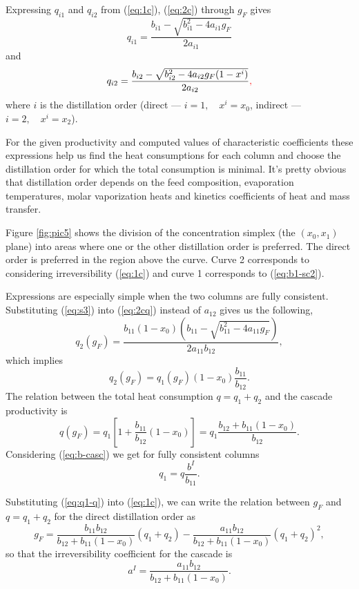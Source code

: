 \documentclass[12pt]{article}
\newcommand{\RED}[1]{\textcolor{red}{#1}}
\begin{document}
Expressing $q_{i1}$ and $q_{i2}$ from (\ref{eq:1c}), (\ref{eq:2c}) through $g_F$ gives
\begin{equation}
q_{i1} = \frac{b_{i1} - \sqrt{b_{i1}^2 - 4a_{i1}g_F}}{2a_{i1}}
\label{eq:1cq}
\end{equation}
and
\begin{equation}
q_{i2}= \frac{b_{i2} - \sqrt{b_{i2}^2 - 4a_{i2}g_F(1-x^i)}}{2a_{i2}}\RED{,}
\label{eq:2cq}
\end{equation}
where $i$ is the distillation order (direct --- $i=1,\quad x^i=x_0$, indirect --- $i=2,\quad x^i=x_2$).
 
For the given productivity and computed values of characteristic coefficients these expressions help us find the heat consumptions for each column and choose the distillation order for which the total consumption is minimal. It's pretty obvious that distillation order depends on the feed composition, evaporation temperatures, molar vaporization heats and kinetics coefficients of heat and mass transfer.

Figure \ref{fig:pic5} shows the division of the concentration simplex (the $(x_0,x_1)$ plane) into areas where one or the other distillation order is preferred. The direct order is preferred in the region above the curve. Curve 2 corresponds to considering irreversibility (\ref{eq:1c}) and curve 1 corresponds to (\ref{eq:b1-sc2}).

Expressions are especially simple when the two columns are fully consistent. Substituting (\ref{eq:s3}) into (\ref{eq:2cq}) instead of $a_{12}$ gives us the following,
\begin{equation}
q_2(g_F) = \frac{b_{11}(1-x_0)\left(b_{11}-\sqrt{b_{11}^2-4a_{11}g_F}\right)}{2a_{11}b_{12}},
\end{equation}
which implies
\begin{equation}
q_2(g_F) = q_1(g_F)(1-x_0)\frac{b_{11}}{b_{12}}.
\label{eq:q2q1}
\end{equation}
The relation between the total heat consumption $q = q_1 + q_2$ and the cascade productivity  is
\begin{equation}
q(g_F) = q_1 \left[1 + \frac{b_{11}}{b_{12}}(1-x_0)\right] = q_1\frac{b_{12} + b_{11}(1-x_0)}{b_{12}}.
\end{equation}
Considering (\ref{eq:b-casc}) we get for fully consistent columns
\begin{equation}
q_1 = q\frac{b^I}{b_{11}}.
\label{eq:q1-q}
\end{equation}

Substituting (\ref{eq:q1-q}) into (\ref{eq:1c}), we can write the relation between $g_F$ and $q = q_1 + q_2$ for the direct distillation order as
\begin{equation}
g_F = \frac{b_{11}b_{12}}{b_{12}+b_{11}(1-x_0)}(q_1 + q_2) - \frac{a_{11}b_{12}}{b_{12} + b_{11}(1-x_0)}(q_1 + q_2)^2,
\label{eq:gf-1v}
\end{equation}
so that the irreversibility coefficient for the cascade is
\begin{equation}
a^{I} = \frac{a_{11}b_{12}}{b_{12} + b_{11}(1-x_0)}.
\label{eq:a-casc}
\end{equation}
\end{document}
